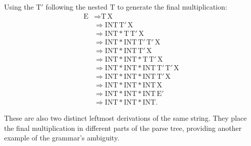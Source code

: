\documentclass{article}
\begin{document}
Using the $\text{T}'$ following the nested $\text{T}$ to generate the
final multiplication:
\[
\begin{aligned}
\text{E}
  &\Rightarrow \text{T}\,\text{X} \\
  &\Rightarrow \mathrm{INT}\,\text{T}'\,\text{X} \\
  &\Rightarrow \mathrm{INT} * \text{T}\,\text{T}'\,\text{X} \\
  &\Rightarrow \mathrm{INT} * \mathrm{INT}\,\text{T}'\,\text{T}'\,\text{X} \\
  &\Rightarrow \mathrm{INT} * \mathrm{INT}\,\text{T}'\,\text{X} \\
  &\Rightarrow \mathrm{INT} * \mathrm{INT} * \text{T}\,\text{T}'\,\text{X} \\
  &\Rightarrow \mathrm{INT} * \mathrm{INT} * \mathrm{INT}\,\text{T}'\,\text{T}'\,\text{X} \\
  &\Rightarrow \mathrm{INT} * \mathrm{INT} * \mathrm{INT}\,\text{T}'\,\text{X} \\
  &\Rightarrow \mathrm{INT} * \mathrm{INT} * \mathrm{INT}\,\text{X} \\
  &\Rightarrow \mathrm{INT} * \mathrm{INT} * \mathrm{INT}\,\text{E}' \\
  &\Rightarrow \mathrm{INT} * \mathrm{INT} * \mathrm{INT}.
\end{aligned}
\]

These are also two distinct leftmost derivations of the same string.
They place the final multiplication in different parts of the parse
tree, providing another example of the grammar's ambiguity.
\end{document}
